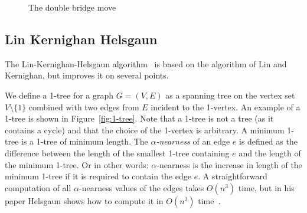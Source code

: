 \documentclass[titlepage, 12pt]{article}
\begin{document}
    \begin{figure}
    \centering
    \caption{The double bridge move}
    \label{fig:double-bridge}
    \end{figure}


    \subsection{Lin Kernighan Helsgaun}
    \label{sec:lkh}
    The Lin-Kernighan-Helsgaun algorithm~\cite{lkh1, lkh2} is based on the algorithm of Lin and
    Kernighan, but improves it on several points.

    We define a 1-tree for a graph $G=(V, E)$ as a spanning tree on the vertex set $V \setminus \{1\}$
    combined with two edges from $E$ incident to the 1-vertex. An example of a 1-tree is shown in
    Figure~\ref{fig:1-tree}. Note that a 1-tree is not a tree (as it contains a cycle) and that the
    choice of the 1-vertex is arbitrary. A minimum 1-tree is a 1-tree of minimum length. The
    \emph{$\alpha$-nearness} of an edge $e$ is defined as the difference between the length of the
    smallest 1-tree containing $e$ and the length of the minimum 1-tree. Or in other words:
    $\alpha$-nearness is the increase in length of the minimum 1-tree if it is required to contain
    the edge $e$.
    A straightforward computation of all $\alpha$-nearness values of the edges takes $O(n^3)$ time,
    but in his paper Helsgaun shows how to compute it in $O(n^2)$ time~\cite{lkh}.
\end{document}
